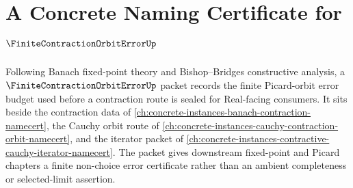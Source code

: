 \chapter{A Concrete Naming Certificate for $\FiniteContractionOrbitErrorUp$}
\label{ch:concrete-instances-finite-contraction-orbit-error-namecert}

Following Banach fixed-point theory and Bishop--Bridges constructive analysis, a $\FiniteContractionOrbitErrorUp$ packet records the finite Picard-orbit error budget used before a contraction route is sealed for Real-facing consumers. It sits beside the contraction data of \autoref{ch:concrete-instances-banach-contraction-namecert}, the Cauchy orbit route of \autoref{ch:concrete-instances-cauchy-contraction-orbit-namecert}, and the iterator packet of \autoref{ch:concrete-instances-contractive-cauchy-iterator-namecert}. The packet gives downstream fixed-point and Picard chapters a finite non-choice error certificate rather than an ambient completeness or selected-limit assertion.

